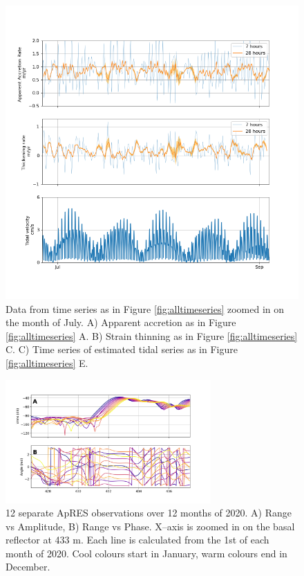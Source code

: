 \begin{figure}[!ht]
\centering
\includegraphics[width=0.7
\textwidth]{chapters/3/zoom_timeseries.png}
\caption[]{Data from time series as in Figure \ref{fig:alltimeseries} zoomed in on the month of July. A) Apparent accretion as in Figure \ref{fig:alltimeseries} A. B) Strain thinning as in Figure \ref{fig:alltimeseries} C. C) Time series of estimated tidal series as in Figure \ref{fig:alltimeseries} E.  
}
\label{fig:zoom_timeseries}
\end{figure}




\begin{figure}[!ht]
\centering
\includegraphics[width=0.7\textwidth]{chapters/3/range_amp_phase.png}
\caption[]{12 separate ApRES observations over 12 months of 2020. A) Range vs Amplitude, B) Range vs Phase. X--axis is zoomed in on the basal reflector at 433 m. Each line is calculated from the 1st of each month of 2020. Cool colours start in January, warm colours end in December. 
}
\label{fig:range_amp_phase}
\end{figure}

